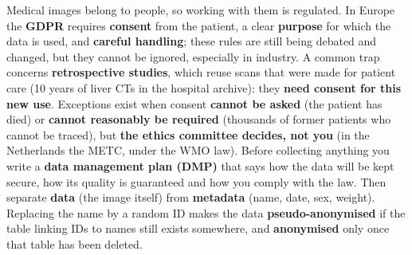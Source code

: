 \documentclass[a4paper]{article}
\newcommand{\K}[1]{\textcolor{kg}{\textbf{#1}}}
\newcommand{\E}[1]{\textcolor{ep}{#1}}
\newcommand{\T}[1]{\textcolor{tr}{\textbf{#1}}}
\begin{document}
Medical images belong to people, so working with them is regulated. In Europe the \K{GDPR} requires \K{consent} from the patient, a clear \K{purpose} for which the data is used, and \K{careful handling}; these rules are still being debated and changed, but they cannot be ignored, especially in industry. A common trap concerns \K{retrospective studies}, which reuse scans that were made for patient care (\E{10 years of liver CTs in the hospital archive}): they \T{need consent for this new use}. Exceptions exist when consent \T{cannot be asked} (\E{the patient has died}) or \T{cannot reasonably be required} (\E{thousands of former patients who cannot be traced}), but \T{the ethics committee decides, not you} (in the Netherlands the METC, under the WMO law). Before collecting anything you write a \K{data management plan (DMP)} that says how the data will be kept secure, how its quality is guaranteed and how you comply with the law. Then separate \K{data} (the image itself) from \K{metadata} (name, date, sex, weight). Replacing the name by a random ID makes the data \K{pseudo-anonymised} if the table linking IDs to names still exists somewhere, and \K{anonymised} only once that table has been deleted.
\end{document}
